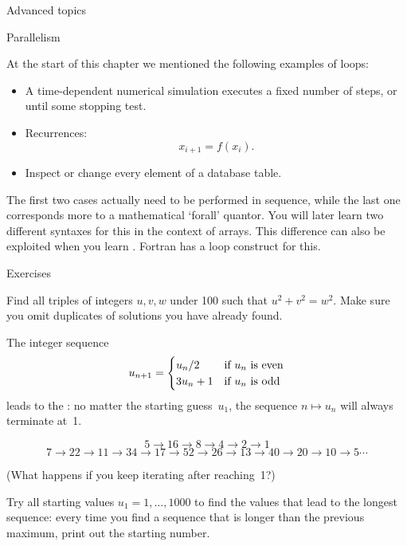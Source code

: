  {Advanced topics}
\label{sec:loop-advanced}

 {Parallelism}

At the start of this chapter we mentioned the following examples of loops:
\begin{itemize}
\item A time-dependent numerical simulation executes a fixed number of
  steps, or until some stopping test.
\item Recurrences: \[ x_{i+1} = f(x_i). \]
\item Inspect or change every element of a database table.
\end{itemize}
The first two cases actually need to be performed in sequence, while
the last one corresponds more to a mathematical `forall' quantor. You
will later learn two different syntaxes for this in the context of arrays.
This
difference can also be exploited when you learn
. Fortran has a
 loop construct for this.

 {Exercises}

\begin{exercise}
  \label{ex:pythagoras}
  Find all triples of integers $u,v,w$ under 100 such that
  $u^2+v^2=w^2$. Make sure you omit duplicates of solutions you have
  already found.
\end{exercise}

\begin{exercise}
  \label{ex:collatz}
  The integer sequence
  \[ u_{n+1} = 
  \begin{cases}
    u_n/2&\hbox{if $u_n$ is even}\\
    3u_n+1&\hbox{if $u_n$ is odd}\\
  \end{cases}
  \]
  leads to the : no matter the starting guess~$u_1$,
  the sequence $n\mapsto u_n$ will always terminate at~1.

  { \small
  \[ 5\rightarrow 16\rightarrow 8\rightarrow 4\rightarrow 2\rightarrow 1\]
  \[ 7\rightarrow 22\rightarrow 11\rightarrow 34\rightarrow
  17\rightarrow 52\rightarrow 26\rightarrow 13\rightarrow
  40\rightarrow 20\rightarrow 10\rightarrow 5\cdots \]
  }

  (What happens if you keep iterating after reaching~1?)
  
  Try all starting values $u_1=1,\ldots,1000$ to find the values that
  lead to the longest sequence: every time you find a sequence that is
  longer than the previous maximum, print out the starting number.
\end{exercise}

